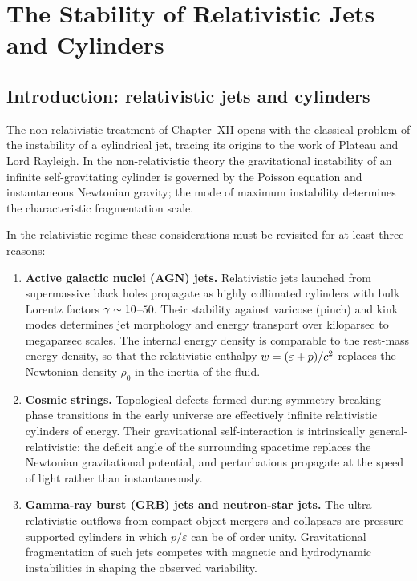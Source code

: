 
\chapter{The Stability of Relativistic Jets and Cylinders}
\label{ch:rel-12}

\section{Introduction: relativistic jets and cylinders}\label{sec:rel-12-107}

The non-relativistic treatment of Chapter~XII opens with the classical
problem of the instability of a cylindrical jet, tracing its origins to
the work of Plateau and Lord Rayleigh. In the non-relativistic theory
the gravitational instability of an infinite self-gravitating cylinder is
governed by the Poisson equation and instantaneous Newtonian gravity;
the mode of maximum instability determines the characteristic
fragmentation scale.

In the relativistic regime these considerations must be revisited for
at least three reasons:
\begin{enumerate}
\item \textbf{Active galactic nuclei (AGN) jets.}  Relativistic jets
  launched from supermassive black holes propagate as highly collimated
  cylinders with bulk Lorentz factors $\gamma\sim 10$--$50$.  Their
  stability against varicose (pinch) and kink modes determines jet
  morphology and energy transport over kiloparsec to megaparsec scales.
  The internal energy density is comparable to the rest-mass energy
  density, so that the relativistic enthalpy $w = (\varepsilon +
  p)/c^{2}$ replaces the Newtonian density $\rho_{0}$ in the inertia of
  the fluid.

\item \textbf{Cosmic strings.}  Topological defects formed during
  symmetry-breaking phase transitions in the early universe are
  effectively infinite relativistic cylinders of energy.  Their
  gravitational self-interaction is intrinsically general-relativistic:
  the deficit angle of the surrounding spacetime replaces the Newtonian
  gravitational potential, and perturbations propagate at the speed of
  light rather than instantaneously.

\item \textbf{Gamma-ray burst (GRB) jets and neutron-star jets.}
  The ultra-relativistic outflows from compact-object mergers and
  collapsars are pressure-supported cylinders in which $p/\varepsilon$
  can be of order unity.  Gravitational fragmentation of such jets
  competes with magnetic and hydrodynamic instabilities in shaping the
  observed variability.
\end{enumerate}

